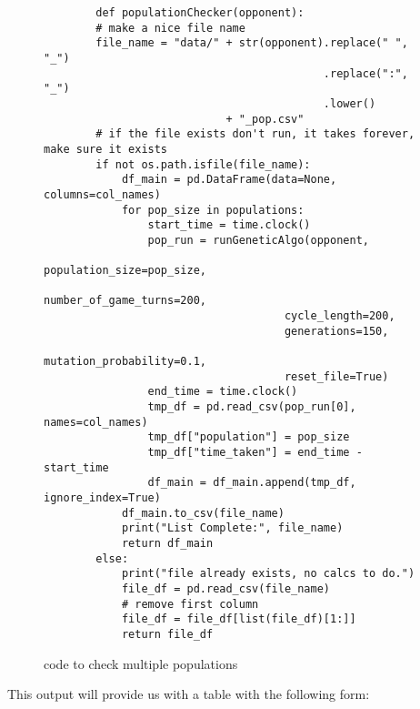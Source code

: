 \begin{figure}\label{code:populationChecker}
    \begin{verbatim}
        def populationChecker(opponent):
        # make a nice file name
        file_name = "data/" + str(opponent).replace(" ", "_")
                                           .replace(":", "_")
                                           .lower() 
                            + "_pop.csv"
        # if the file exists don't run, it takes forever, make sure it exists 
        if not os.path.isfile(file_name):
            df_main = pd.DataFrame(data=None, columns=col_names)
            for pop_size in populations:
                start_time = time.clock()
                pop_run = runGeneticAlgo(opponent,
                                     population_size=pop_size,
                                     number_of_game_turns=200,
                                     cycle_length=200,
                                     generations=150,
                                     mutation_probability=0.1,
                                     reset_file=True)
                end_time = time.clock()
                tmp_df = pd.read_csv(pop_run[0], names=col_names)
                tmp_df["population"] = pop_size
                tmp_df["time_taken"] = end_time - start_time
                df_main = df_main.append(tmp_df, ignore_index=True)
            df_main.to_csv(file_name)
            print("List Complete:", file_name)
            return df_main
        else:
            print("file already exists, no calcs to do.")
            file_df = pd.read_csv(file_name)
            # remove first column
            file_df = file_df[list(file_df)[1:]]
            return file_df
    \end{verbatim}
    \caption{code to check multiple populations} \label{code:populationChecker}   
\end{figure}
This output will provide us with a table with the following form:
